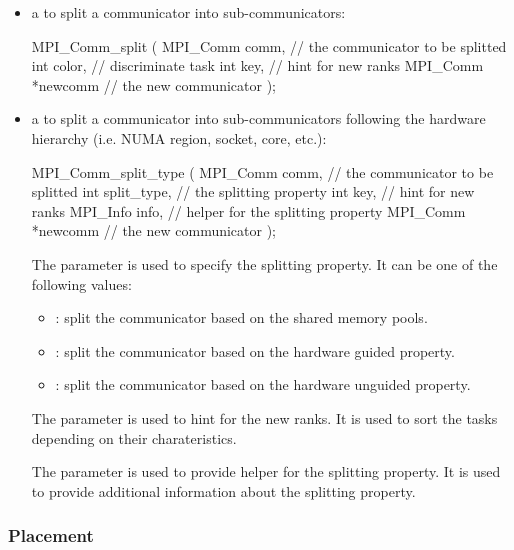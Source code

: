 \begin{itemize}

    \item a  to split a communicator into sub-communicators:

\begin{codeblock}[language=C]
MPI_Comm_split ( 
    MPI_Comm comm,      // the communicator to be splitted
    int color,          // discriminate task
    int key,            // hint for new ranks
    MPI_Comm *newcomm   // the new communicator
);
\end{codeblock}

\item a  to split a communicator into sub-communicators following the hardware hierarchy (i.e. NUMA region, socket, core, etc.):
\begin{codeblock}[language=C]
MPI_Comm_split_type ( 
    MPI_Comm comm,      // the communicator to be splitted
    int split_type,     // the splitting property
    int key,            // hint for new ranks
    MPI_Info info,      // helper for the splitting property
    MPI_Comm *newcomm   // the new communicator
);
\end{codeblock}

The  parameter is used to specify the splitting property. It can be one of the following values:
\begin{itemize}
    \item {}: split the communicator based on the shared memory pools.
    \item {}: split the communicator based on the hardware guided property.
    \item {}: split the communicator based on the hardware unguided property.
\end{itemize}

The  parameter is used to hint for the new ranks. It is used to sort the tasks depending on their charateristics.

The  parameter is used to provide helper for the splitting property. It is used to provide additional information about the splitting property.

\end{itemize}

\subsubsection{Placement}

